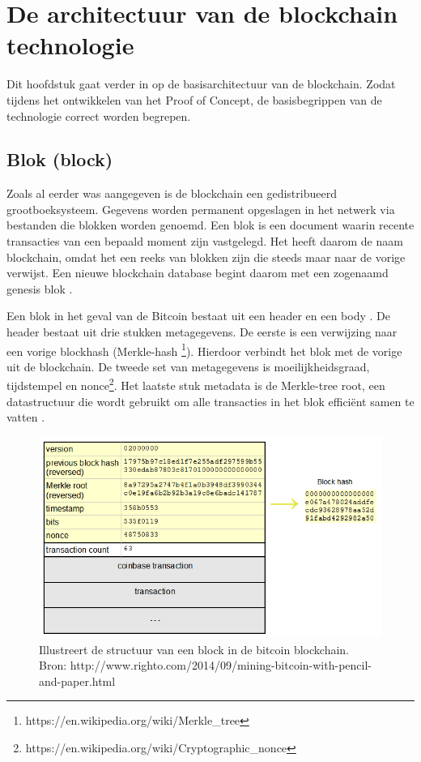 \chapter{De architectuur van de blockchain technologie}
Dit hoofdstuk gaat verder in op de basisarchitectuur van de blockchain. Zodat tijdens het ontwikkelen van het Proof of Concept, de basisbegrippen van de technologie correct worden begrepen.

\section{Blok (block)}
Zoals al eerder was aangegeven is de blockchain een gedistribueerd grootboeksysteem. Gegevens worden permanent opgeslagen in het netwerk via bestanden die blokken worden genoemd. Een blok is een document waarin recente transacties van een bepaald moment zijn vastgelegd. Het heeft daarom de naam blockchain, omdat het een reeks van blokken zijn die steeds maar naar de vorige verwijst. Een nieuwe blockchain database begint daarom met een zogenaamd genesis blok \cite{blochchainTechSymmbioticDev}.\par
					
Een blok in het geval van de Bitcoin bestaat uit een header en een body \cite{blockchainIssuesAndChallenges}. De header bestaat uit drie stukken metagegevens. De eerste is een verwijzing naar een vorige blockhash (Merkle-hash \footnote{https://en.wikipedia.org/wiki/Merkle\_tree}). Hierdoor verbindt het blok met de vorige uit de blockchain. De tweede set van metagegevens is moeilijkheidsgraad, tijdstempel en nonce\footnote{https://en.wikipedia.org/wiki/Cryptographic\_nonce}. Het laatste stuk metadata is de Merkle-tree root, een datastructuur die wordt gebruikt om alle transacties in het blok efficiënt samen te vatten \cite{masteringBitcoin}.

\begin{figure}[h]
    \begin{center}
        \includegraphics[width=\paperwidth-335]{images/block}
        \caption{Illustreert de structuur van een block in de bitcoin blockchain.\\Bron: http://www.righto.com/2014/09/mining-bitcoin-with-pencil-and-paper.html}
        \label{fig:blockchain?}
    \end{center}
\end{figure}
\newpage

